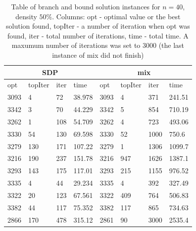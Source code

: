 \documentclass[12pt]{book}
\theoremstyle{definition}
\begin{document}
\begin{table}
\centering
\begin{tabular}{|l|l|l|l|l|l|l|l|}\hline
\multicolumn{4}{|c|}{SDP} & \multicolumn{4}{|c|}{mix} \\ \hline 
opt  &  topIter  &  iter &  time &  opt  &  topIter &  iter 	 &  time    \\
\hline  \hline  

    3093    &     4      &       72    &     38.978   &   3093    &     4     &        371   &     241.51      \\      
    3342    &     3      &       70    &     44.229   &   3342    &     5     &        854   &     710.19      \\       
    3262    &     1      &      108    &     54.709   &   3262    &     4     &        723   &     493.06      \\    
    3330    &    54      &      130    &     69.598   &   3330    &    52     &       1000   &      750.6      \\    
    3279    &   130      &      171    &     107.22   &   3279    &     1     &       1306   &     1099.7      \\    
    3216    &   190      &      237    &     151.78   &   3216    &   947     &       1626   &     1387.1      \\    
    3293    &   143      &      175    &     117.01   &   3293    &   215     &       1155   &     976.52      \\    
    3335    &     4      &       44    &     29.234   &   3335    &     4     &        392   &     327.49      \\    
    3322    &    20      &      123    &     67.561   &   3322    &   409     &        764   &     506.83      \\    
    3382    &    44      &      117    &     75.352   &   3382    &   117     &        865   &     734.63      \\    
    2866    &   170      &      478    &     315.12   &   2861    &    90     &       3000   &     2535.4      \\  \hline 
\end{tabular}
\caption[Branch and bound comparison table]{Table of branch and bound solution instances for $n=40$, density $50\%$.
Columns: opt - optimal value or the best solution found, topIter - a number of iteration when opt was found, iter - total number of iterations, time - total time. A maxumum number of iterations was set to 3000 (the last instance of mix did not finish)}
\label{TableBnb}
\end{table}
\end{document}
